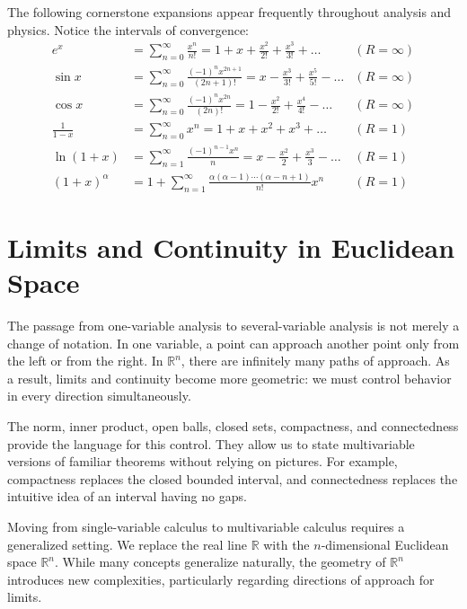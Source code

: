 \begin{example}
The following cornerstone expansions appear frequently throughout analysis and physics. Notice the intervals of convergence:
\begin{align*}
    e^x &= \sum_{n=0}^{\infty} \frac{x^n}{n!} = 1 + x + \frac{x^2}{2!} + \frac{x^3}{3!} + \dots & (R = \infty) \\
    \sin x &= \sum_{n=0}^{\infty} \frac{(-1)^n x^{2n+1}}{(2n+1)!} = x - \frac{x^3}{3!} + \frac{x^5}{5!} - \dots & (R = \infty) \\
    \cos x &= \sum_{n=0}^{\infty} \frac{(-1)^n x^{2n}}{(2n)!} = 1 - \frac{x^2}{2!} + \frac{x^4}{4!} - \dots & (R = \infty) \\
    \frac{1}{1-x} &= \sum_{n=0}^{\infty} x^n = 1 + x + x^2 + x^3 + \dots & (R = 1) \\
    \ln(1+x) &= \sum_{n=1}^{\infty} \frac{(-1)^{n-1} x^n}{n} = x - \frac{x^2}{2} + \frac{x^3}{3} - \dots & (R = 1) \\
    (1+x)^\alpha &= 1 + \sum_{n=1}^{\infty} \frac{\alpha(\alpha-1)\cdots(\alpha-n+1)}{n!} x^n & (R = 1)
\end{align*}
\end{example}

\section{Limits and Continuity in Euclidean Space}


The passage from one-variable analysis to several-variable analysis is not merely a change of notation. In one variable, a point can approach another point only from the left or from the right. In $\mathbb{R}^n$, there are infinitely many paths of approach. As a result, limits and continuity become more geometric: we must control behavior in every direction simultaneously.

The norm, inner product, open balls, closed sets, compactness, and connectedness provide the language for this control. They allow us to state multivariable versions of familiar theorems without relying on pictures. For example, compactness replaces the closed bounded interval, and connectedness replaces the intuitive idea of an interval having no gaps.

Moving from single-variable calculus to multivariable calculus requires a generalized setting. We replace the real line $\mathbb{R}$ with the $n$-dimensional Euclidean space $\mathbb{R}^n$. While many concepts generalize naturally, the geometry of $\mathbb{R}^n$ introduces new complexities, particularly regarding directions of approach for limits.

